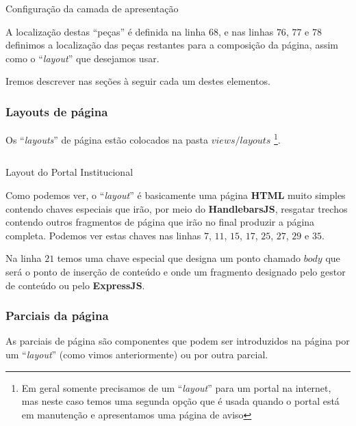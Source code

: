 \begin{code}
    \inputminted[label=default.js,firstline=67,lastline=81]{JavaScript}{../RS0003/anexos/default.js}
    \caption{Configuração da camada de apresentação}\label{RS0003:code:conf-views}
\end{code}

A localização destas ``peças'' é definida na linha $68$, e nas linhas $76$, $77$ e $78$ definimos a localização das peças restantes para a composição da página, assim como o ``\textit{layout}'' que desejamos usar.

Iremos descrever nas seções à seguir cada um destes elementos.


\subsubsection{Layouts de página}

Os ``\textit{layouts}'' de página estão colocados na pasta $views / layouts$ \footnote{Em geral somente precisamos de um ``\textit{layout}'' para um portal na internet, mas neste caso temos uma segunda opção que é usada quando o portal está em manutenção e apresentamos uma página de aviso}.

\begin{code}
    \inputminted[label=default.handlebars]{HTML}{../RS0003/anexos/default.handlebars}
    \caption{Layout do Portal Institucional}\label{RS0003:code:layout}
\end{code}

Como podemos ver, o ``\textit{layout}'' é basicamente uma página \textbf{HTML} muito simples contendo chaves especiais que irão, por meio do \textbf{HandlebarsJS}, resgatar trechos contendo outros fragmentos de página que irão no final produzir a página completa. Podemos ver estas chaves nas linhas $7$, $11$, $15$, $17$, $25$, $27$, $29$ e $35$.

Na linha $21$ temos uma chave especial que designa um ponto chamado $body$ que será o ponto de inserção de conteúdo e onde um fragmento designado pelo gestor de conteúdo ou pelo \textbf{ExpressJS}.


\subsubsection{Parciais da página}

As parciais de página são componentes que podem ser introduzidos na página por um ``\textit{layout}'' (como vimos anteriormente) ou por outra parcial.

